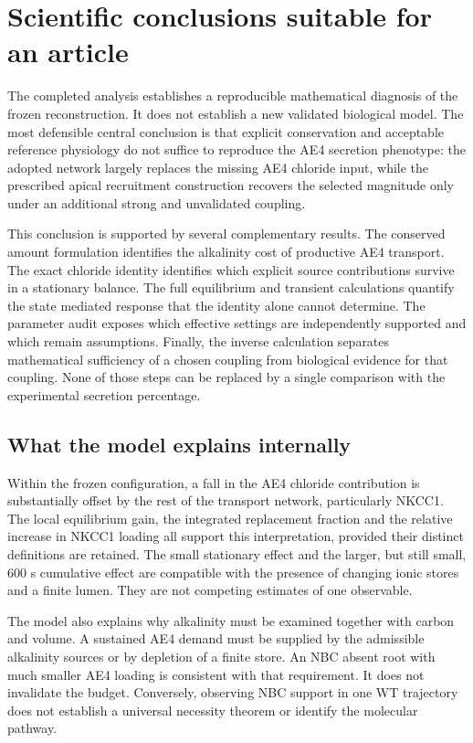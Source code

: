 \section{Scientific conclusions suitable for an article}
\label{sec:report-article-conclusions}
The completed analysis establishes a reproducible mathematical diagnosis of the frozen reconstruction. It does not establish a new validated biological model. The most defensible central conclusion is that explicit conservation and acceptable reference physiology do not suffice to reproduce the AE4 secretion phenotype: the adopted network largely replaces the missing AE4 chloride input, while the prescribed apical recruitment construction recovers the selected magnitude only under an additional strong and unvalidated coupling.

This conclusion is supported by several complementary results. The conserved amount formulation identifies the alkalinity cost of productive AE4 transport. The exact chloride identity identifies which explicit source contributions survive in a stationary balance. The full equilibrium and transient calculations quantify the state mediated response that the identity alone cannot determine. The parameter audit exposes which effective settings are independently supported and which remain assumptions. Finally, the inverse calculation separates mathematical sufficiency of a chosen coupling from biological evidence for that coupling. None of those steps can be replaced by a single comparison with the experimental secretion percentage.

\subsection{What the model explains internally}
Within the frozen configuration, a fall in the AE4 chloride contribution is substantially offset by the rest of the transport network, particularly NKCC1. The local equilibrium gain, the integrated replacement fraction and the relative increase in NKCC1 loading all support this interpretation, provided their distinct definitions are retained. The small stationary effect and the larger, but still small, 600 s cumulative effect are compatible with the presence of changing ionic stores and a finite lumen. They are not competing estimates of one observable.

The model also explains why alkalinity must be examined together with carbon and volume. A sustained AE4 demand must be supplied by the admissible alkalinity sources or by depletion of a finite store. An NBC absent root with much smaller AE4 loading is consistent with that requirement. It does not invalidate the budget. Conversely, observing NBC support in one WT trajectory does not establish a universal necessity theorem or identify the molecular pathway.

